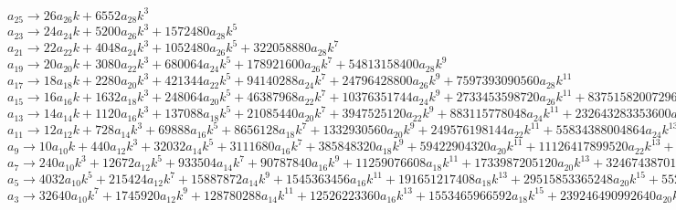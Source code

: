 \documentclass[12pt,a4paper,draft]{article}
\begin{document}
$a_{25}\to 26 a_{26} k+6552 a_{28} k^3$\\
$a_{23}\to 24 a_{24} k+5200 a_{26} k^3+1572480 a_{28} k^5$\\
$a_{21}\to 22 a_{22} k+4048 a_{24} k^3+1052480 a_{26} k^5+322058880 a_{28} k^7$\\
$a_{19}\to 20 a_{20} k+3080 a_{22} k^3+680064 a_{24} k^5+178921600 a_{26} k^7+54813158400 a_{28} k^9$\\
$a_{17}\to 18 a_{18} k+2280 a_{20} k^3+421344 a_{22} k^5+94140288 a_{24} k^7+24796428800 a_{26} k^9+7597393090560 a_{28} k^{11}$\\
$a_{15}\to 16 a_{16} k+1632 a_{18} k^3+248064 a_{20} k^5+46387968 a_{22} k^7+10376351744 a_{24} k^9+2733453598720 a_{26} k^{11}+837515820072960 a_{28} k^{13}$\\
$a_{13}\to 14 a_{14} k+1120 a_{16} k^3+137088 a_{18} k^5+21085440 a_{20} k^7+3947525120 a_{22} k^9+883115778048 a_{24} k^{11}+232643283353600 a_{26} k^{13}+71280785877073920 a_{28} k^{15}$\\
$a_{11}\to 12 a_{12} k+728 a_{14} k^3+69888 a_{16} k^5+8656128 a_{18} k^7+1332930560 a_{20} k^9+249576198144 a_{22} k^{11}+55834388004864 a_{24} k^{13}+14708733593681920 a_{26} k^{15}+4506686150828359680 a_{28} k^{17}$\\
$a_{9}\to 10 a_{10} k+440 a_{12} k^3+32032 a_{14} k^5+3111680 a_{16} k^7+385848320 a_{18} k^9+59422904320 a_{20} k^{11}+11126417899520 a_{22} k^{13}+2489170300469248 a_{24} k^{15}+655734757395660800 a_{26} k^{17}+200914020585819340800 a_{28} k^{19}$\\
$a_{7}\to 240 a_{10} k^3+12672 a_{12} k^5+933504 a_{14} k^7+90787840 a_{16} k^9+11259076608 a_{18} k^{11}+1733987205120 a_{20} k^{13}+324674387017728 a_{22} k^{15}+72635234665365504 a_{24} k^{17}+19134668627220889600 a_{26} k^{19}+5862771754821054627840 a_{28} k^{21}+8 a_{8} k$\\
$a_{5}\to 4032 a_{10} k^5+215424 a_{12} k^7+15887872 a_{14} k^9+1545363456 a_{16} k^{11}+191651217408 a_{18} k^{13}+29515853365248 a_{20} k^{15}+5526593941929984 a_{22} k^{17}+1236393972835811328 a_{24} k^{19}+325709541934503034880 a_{26} k^{21}+99795859565893449154560 a_{28} k^{23}+6 a_{6} k+112 a_{8} k^3$\\
$a_{3}\to 32640 a_{10} k^7+1745920 a_{12} k^9+128780288 a_{14} k^{11}+12526223360 a_{16} k^{13}+1553465966592 a_{18} k^{15}+239246490992640 a_{20} k^{17}+44796883073761280 a_{22} k^{19}+10021832059523170304 a_{24} k^{21}+2640102104917816115200 a_{26} k^{23}+808914769103121354326016 a_{28} k^{25}+4 a_{4} k+40 a_{6} k^3+896 a_{8} k^5$\\
\end{document}
